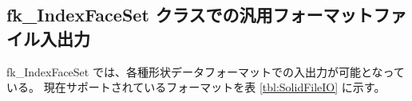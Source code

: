 % 
% 
% 
% 
% 

\subsection{fk\_IndexFaceSet クラスでの汎用フォーマットファイル入出力}
fk\_IndexFaceSet では、各種形状データフォーマットでの入出力が可能となっている。
現在サポートされているフォーマットを表 \ref{tbl:SolidFileIO} に示す。

